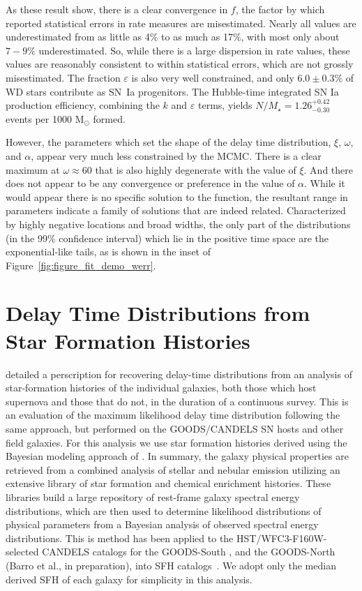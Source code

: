 \documentclass[apj]{aastex62}
\begin{document}
As these result show, there is a clear convergence in $f$, the factor by which reported statistical errors in rate measures are misestimated. Nearly all values are underestimated from as little as 4\% to as much as 17\%, with most only about $7-9\%$ underestimated. So, while there is a large dispersion in rate values, these values are reasonably consistent to within statistical errors, which are not grossly misestimated. The fraction $\varepsilon$ is also very well constrained, and only $6.0\pm0.3\%$ of WD stars contribute as SN~Ia progenitors. The Hubble-time integrated SN Ia production efficiency, combining the $k$ and $\varepsilon$ terms, yields $N/M_{\star}=1.26^{+0.42}_{-0.30}$ events per 1000 M$_{\odot}$ formed.


However, the parameters which set the shape of the delay time distribution,  $\xi$, $\omega$, and $\alpha$, appear very much less constrained by the MCMC. There is a clear maximum at $\omega\approx60$ that is also highly degenerate with the value of $\xi$.  And there does not appear to be any convergence or preference in the value of $\alpha$. While it would appear there is no specific solution to the function, the resultant range in parameters indicate a family of solutions that are indeed related. Characterized by highly negative locations and broad widths, the only part of the distributions (in the 99\% confidence interval) which lie in the positive time space are the exponential-like tails, as is shown in the inset of Figure~\ref{fig:figure_fit_demo_werr}.



\section{Delay Time Distributions from Star Formation Histories}\label{sec:sfh}
\cite{Maoz:2011} detailed a perscription for recovering delay-time distributions from an analysis of star-formation histories of the individual galaxies, both those which host supernova and those that do not, in the duration of a continuous survey. This is an evaluation of the maximum likelihood delay time distribution following the same approach, but performed on the GOODS/CANDELS SN hosts and other field galaxies. For this analysis we use star formation histories derived using the Bayesian modeling approach of \cite{Pacifici:2012ve}. In summary, the galaxy physical properties are retrieved from a combined analysis of stellar and nebular emission utilizing an extensive library of star formation and chemical enrichment histories. These libraries build a large repository of rest-frame galaxy spectral energy distributions, which are then used to determine likelihood distributions of physical parameters from a Bayesian analysis of observed spectral energy distributions. This is method has been applied to the HST/WFC3-F160W-selected CANDELS catalogs for the GOODS-South \citep{Guo:2013rp}, and the GOODS-North (Barro et al., in preparation), into SFH catalogs~\cite[see][]{Pacifici:2016ul}. We adopt only the median derived SFH of each galaxy for simplicity in this analysis.
\end{document}
